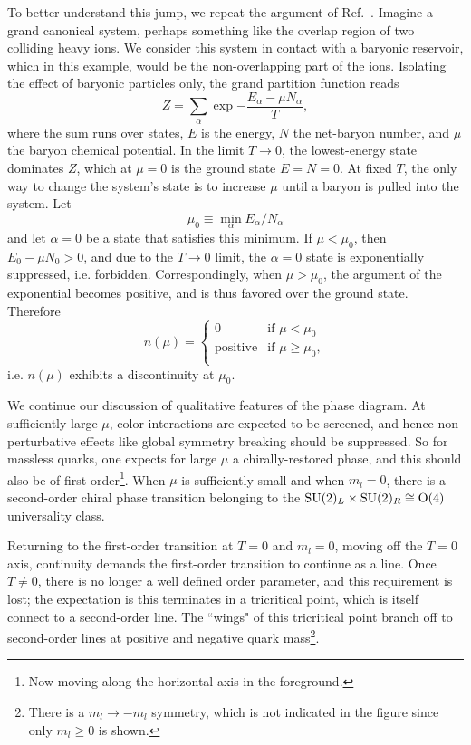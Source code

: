 To better understand this jump, we repeat the argument of
Ref.~\cite{halasz_phase_1998}. Imagine a grand canonical system, perhaps
something like the overlap region of two colliding heavy ions. We consider
this system in contact with a baryonic reservoir, which in this example,
would be the non-overlapping part of the ions. Isolating the effect of baryonic
particles only, the grand partition function
reads
\begin{equation}
Z=\sum_\alpha\exp{-\frac{E_\alpha-\mu N_\alpha}{T}},
\end{equation}
where the sum runs over states, $E$ is the energy, $N$ the net-baryon number,
and $\mu$ the baryon chemical potential. In the limit $T\to0$, the lowest-energy
state dominates $Z$, which at $\mu=0$ is the ground state $E=N=0$. At fixed $T$,
the only way to change the system's state is to increase $\mu$ until a baryon
is pulled into the system. Let
\begin{equation}
\mu_0\equiv\min_\alpha E_\alpha/N_\alpha
\end{equation}
and let $\alpha=0$ be a state that satisfies this minimum. If $\mu<\mu_0$, then
$E_0-\mu N_0>0$, and due to the $T\to0$ limit, the $\alpha=0$ state is
exponentially suppressed, i.e. forbidden. Correspondingly, when $\mu>\mu_0$, 
the argument of the exponential becomes positive, and is thus favored over the
ground state. Therefore
\begin{equation}
n(\mu) = 
\begin{cases} 
    0 & \text{if } \mu < \mu_0 \\ 
    \text{positive} & \text{if } \mu \geq\mu_0, \\
\end{cases}
\end{equation}
i.e. $n(\mu)$ exhibits a discontinuity at $\mu_0$.

We continue our discussion of qualitative features of the phase diagram.
At sufficiently large $\mu$, color interactions are expected to be screened,
and hence non-perturbative effects like global symmetry breaking should
be suppressed. So for massless quarks, one expects for large $\mu$
a chirally-restored phase, and this should also be of 
first-order\footnote{Now moving along the horizontal axis in
the foreground.}. 
When $\mu$ is sufficiently small and when $m_l=0$,
there is a second-order chiral phase transition belonging to the
$\operatorname{SU}(2)_L\times\operatorname{SU}(2)_R\cong\operatorname{\text{O}}(4)$ universality class.

Returning to the first-order transition at $T=0$ and $m_l=0$,
moving off the $T=0$ axis, continuity demands
the first-order transition to continue as a line. Once $T\neq0$, there
is no longer a well defined order parameter, and this requirement is lost;
the expectation is this terminates in a tricritical point, which is
itself connect to a second-order line. The ``wings" of this tricritical
point branch off to second-order lines at positive and negative quark
mass\footnote{There is a $m_l\to-m_l$ symmetry, which is not indicated
in the figure since only $m_l\geq0$ is shown.}.

